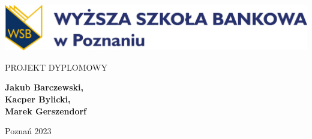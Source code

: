 \documentclass[12pt, oneside, a4paper]{book}
\begin{document}
\fancyhf{}
\renewcommand{\headrulewidth}{0pt}
\pagestyle{fancy}
\fancyfoot[C]{\thepage}
\begin{titlepage}
    \begin{center}

        \includegraphics[width=1\textwidth]{../wsb-logo.png}

        \MakeUppercase{\department}

        \vspace*{1cm}

        \textbf{\topic}

        PROJEKT DYPLOMOWY

        \vspace*{1.5cm}
        \textbf{Jakub Barczewski,\\ Kacper Bylicki,\\ Marek Gerszendorf}

        \vfill
        Poznań 2023

    \end{center}
\end{titlepage}
\end{document}
